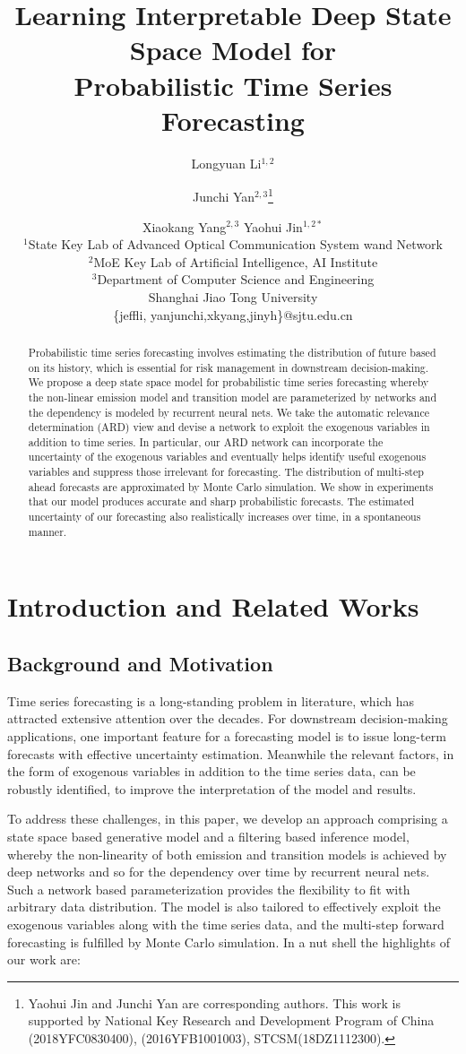 \documentclass{article}
\title{Learning Interpretable Deep State Space Model for\\ Probabilistic Time Series Forecasting}
\author{
Longyuan Li$^{1,2}$\and
Junchi Yan$^{2,3}$\footnote{Yaohui Jin and Junchi Yan are corresponding authors. This work is supported by National Key Research and Development Program of China (2018YFC0830400), (2016YFB1001003), STCSM(18DZ1112300).}\and
Xiaokang Yang$^{2,3}$\And
Yaohui Jin$^{1,2*}$\\
\affiliations
$^1$State Key Lab of Advanced Optical Communication System wand Network\\
$^2$MoE Key Lab of Artificial Intelligence, AI
Institute\\
$^3$Department of Computer Science and Engineering\\Shanghai Jiao Tong University\\
\emails
\{jeffli, yanjunchi,xkyang,jinyh\}@sjtu.edu.cn
}
\begin{document}
\maketitle
\begin{abstract}
Probabilistic time series forecasting involves estimating the distribution of future based on its history, which is essential for risk management in downstream decision-making. We propose a deep state space model for probabilistic time series forecasting whereby the non-linear emission model and transition model are parameterized by networks and the dependency is modeled by recurrent neural nets. We take the automatic relevance determination (ARD) view and devise a network to exploit the exogenous variables in addition to time series. In particular, our ARD network can incorporate the uncertainty of the exogenous variables and eventually helps identify useful exogenous variables and suppress those irrelevant for forecasting. The distribution of multi-step ahead forecasts are approximated by Monte Carlo simulation. We show in experiments that our model produces accurate and sharp probabilistic forecasts. The estimated uncertainty of our forecasting also realistically increases over time, in a spontaneous manner.
\end{abstract}

\section{Introduction and Related Works}
\subsection{Background and Motivation}
Time series forecasting is a long-standing problem in literature, which has attracted extensive attention over the decades. For downstream decision-making applications, one important feature for a forecasting model is to issue long-term forecasts with effective uncertainty estimation. Meanwhile the relevant factors, in the form of exogenous variables in addition to the time series data, can be robustly identified, to improve the interpretation of the model and results.

To address these challenges, in this paper, we develop an approach comprising a state space based generative model and a filtering based inference model, whereby the non-linearity of both emission and transition models is achieved by deep networks and so for the dependency over time by recurrent neural nets. Such a network based parameterization provides the flexibility to fit with arbitrary data distribution. The model is also tailored to effectively exploit the exogenous variables along with the time series data, and the multi-step forward forecasting is fulfilled by Monte Carlo simulation. In a nut shell the highlights of our work are:
\end{document}
